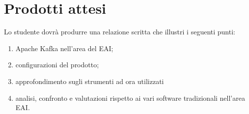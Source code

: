 \section*{Prodotti attesi}
Lo studente dovrà produrre una relazione scritta che illustri i seguenti punti:
\begin{enumerate}
    \item Apache Kafka nell'area del EAI;
    \item configurazioni del prodotto;
    \item approfondimento sugli strumenti ad ora utilizzati
    \item analisi, confronto e valutazioni rispetto ai vari software tradizionali nell'area EAI.
\end{enumerate}
